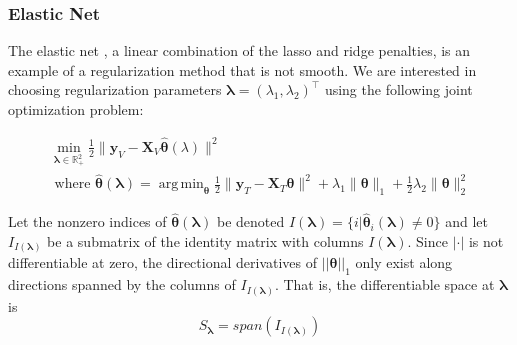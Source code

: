 \documentclass[10pt,letterpaper]{article}
\DeclareMathOperator*{\argmin}{arg\,min}
\begin{document}
%



\subsubsection{Elastic Net}\label{sec:enet}

The elastic net \citep{zou2003regression}, a linear combination of the lasso and ridge penalties, is an example of a regularization method that is not smooth. We are interested in choosing regularization parameters $\boldsymbol{\lambda} = (\lambda_1, \lambda_2)^\top$ using the following joint optimization problem:

\begin{equation}
\begin{array}{c}
\min_{\boldsymbol{\lambda} \in \mathbb{R}^2_{+}} \frac{1}{2} \| \boldsymbol{y}_V - \boldsymbol{X}_V \hat{\boldsymbol{\theta}} (\lambda) \| ^2 \\
\text{ where }
\hat{\boldsymbol{\theta}} (\boldsymbol{\lambda}) = \argmin_{\boldsymbol{\theta}} \frac{1}{2} \| \boldsymbol{y}_T - \boldsymbol{X}_T \boldsymbol{\theta} \| ^2
+ \lambda_1 \| \boldsymbol{\theta} \|_1
+ \frac{1}{2}\lambda_2 \| \boldsymbol{\theta} \|_2^2
\end{array}
\end{equation}

Let the nonzero indices of $\hat{\boldsymbol{\theta}}(\boldsymbol{\lambda})$ be denoted $I(\boldsymbol\lambda) = \{i | \hat{\boldsymbol{\theta}}_i(\boldsymbol\lambda) \ne 0\}$ and let $I_{I(\boldsymbol \lambda)}$ be a submatrix of the identity matrix with columns $I(\boldsymbol\lambda)$. Since $|\cdot|$ is not differentiable at zero, the directional derivatives of $||\boldsymbol \theta||_1$ only exist along directions spanned by the columns of $I_{I(\boldsymbol \lambda)}$. That is, the differentiable space at $\boldsymbol \lambda$ is
\begin{equation}
S_{\boldsymbol{\lambda}} = span(I_{I(\boldsymbol \lambda)})
\end{equation}
\end{document}
